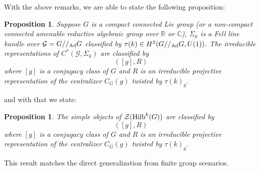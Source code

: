 \documentclass[a4paper,11pt]{article}
\newtheorem{prop}[lemma]{Proposition}
\newcommand{\be}{\begin{equation}}
\newcommand{\ee}{\end{equation}}
\def\bbC{\mathbb{C}}
\def\bbR{\mathbb{R}}
\def\CG{\mathcal{G}}
\def\CZ{\mathcal{Z}}
\def\hilb{{\rm Hilb}}
\def\gmg{G//_{\rm Ad} G}
\begin{document}
With the above remarks, we are able to state the following proposition:
\begin{prop}
    Suppose $G$ is a compact connected Lie group (or a non-compact connected amenable reductive algebraic group over $\bbR$ or $\bbC$), $\Sigma_k$ is a Fell line bundle over $\CG = G//_{\rm Ad} G$ classified by $\tau(k)\in H^2(\gmg,U(1))$. The irreducible representations of $C^*(\CG,\Sigma_k)$ are classified by
    \be ([g], R )  \ee
    where $[g]$ is a conjugacy class of $G$ and $R$ is an irreducible projective representation of the centralizer $C_G(g)$ twisted by $\tau(k)_g$.
\end{prop}
and with that we state:
\begin{prop}\label{prop:centerclassify}
    The simple objects of $\CZ(\hilb^k(G))$ are classified by
    \be ([g], R )  \ee
    where $[g]$ is a conjugacy class of $G$ and $R$ is an irreducible projective representation of the centralizer $C_G(g)$ twisted by $\tau(k)_g$.
\end{prop}
This result matches the direct generalization from finite group scenarios.
\end{document}
